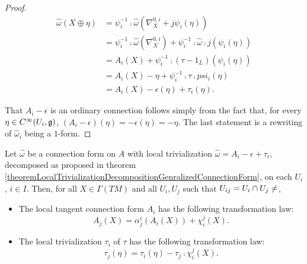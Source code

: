 \begin{proof}
\begin{align*}
    \hat \omega(X \oplus \eta) 
        &= \psi_i^{-1} \comp \hat \omega (\nabla^{0, i}_X + j\psi_i(\eta)) \\
        &= \psi_i^{-1} \comp \hat \omega (\nabla^{0, i}_X) + \psi_i^{-1} \comp \hat \omega \comp j (\psi_i(\eta))\\
        &= A_i(X) + \psi_i^{-1} \comp (\tau - 1_L) (\psi_i(\eta))\\
        &= A_i(X) - \eta + \psi_i^{-1} \comp \tau \comp psi_i(\eta) \\
        &= A_i(X) - \epsilon(\eta) + \tau_i(\eta).
\end{align*}

That $A_i - \epsilon$ is an ordinary connection follows simply from the fact that, for every $\eta \in C^\infty(U_i, \mathfrak{g})$, $(A_i - \epsilon)(\eta) = - \epsilon(\eta) = -\eta$. The last statement is a rewriting of $\hat \omega_i$ being a $1$-form.
\end{proof}

\begin{proposition}\label{propositionTransformationLawsOfAandTau}
Let $\hat \omega$ be a connection form on $A$ with local trivialization $\hat \omega = A_i - \epsilon + \tau_i$, decomposed as proposed in theorem \ref{theoremLocalTrivializationDecompositionGenralizedConnectionForm}, on each $U_i$, $i \in I$. Then, for all $X \in \Gamma(TM)$ and all $U_i, U_j$ such that $U_{ij} = U_i \inter U_j \neq \empty$,

    \begin{itemize}
    
    \item The local tangent connection form $A_i$ has the following transformation law:
        \begin{equation}
                A_j(X) = \alpha^i_j(A_i(X)) + \chi^j_i(X).
        \end{equation}
    
    \item The local trivialization $\tau_i$ of $\tau$ has the following transformation law:
        \begin{equation}
                \tau_j(\eta) = \tau_i(\eta) - \tau_j \comp \chi^j_i(X).
        \end{equation}\todo{}
    
    \end{itemize}
\end{proposition}

